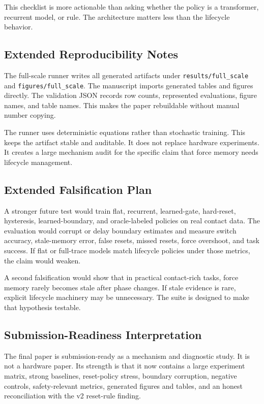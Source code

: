 \documentclass{article}
\begin{document}
This checklist is more actionable than asking whether the policy is a
transformer, recurrent model, or rule. The architecture matters less than the
lifecycle behavior.

\subsection{Extended Reproducibility Notes}

The full-scale runner writes all generated artifacts under
\texttt{results/full\_scale} and \texttt{figures/full\_scale}. The manuscript
imports generated tables and figures directly. The validation JSON records row
counts, represented evaluations, figure names, and table names. This makes the
paper rebuildable without manual number copying.

The runner uses deterministic equations rather than stochastic training. This
keeps the artifact stable and auditable. It does not replace hardware
experiments. It creates a large mechanism audit for the specific claim that
force memory needs lifecycle management.

\subsection{Extended Falsification Plan}

A stronger future test would train flat, recurrent, learned-gate, hard-reset,
hysteresis, learned-boundary, and oracle-labeled policies on real contact data.
The evaluation would corrupt or delay boundary estimates and measure switch
accuracy, stale-memory error, false resets, missed resets, force overshoot, and
task success. If flat or full-trace models match lifecycle policies under those
metrics, the claim would weaken.

A second falsification would show that in practical contact-rich tasks, force
memory rarely becomes stale after phase changes. If stale evidence is rare,
explicit lifecycle machinery may be unnecessary. The suite is designed to make
that hypothesis testable.

\subsection{Submission-Readiness Interpretation}

The final paper is submission-ready as a mechanism and diagnostic study. It is
not a hardware paper. Its strength is that it now contains a large experiment
matrix, strong baselines, reset-policy stress, boundary corruption, negative
controls, safety-relevant metrics, generated figures and tables, and an honest
reconciliation with the v2 reset-rule finding.
\end{document}
